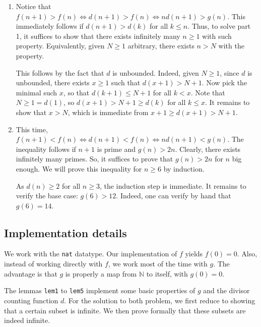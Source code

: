 \documentclass{article}
\newcommand{\N}{\mathbb{N}}
\begin{document}
\begin{enumerate}

\item
Notice that $f(n + 1) > f(n) \iff d(n + 1) > f(n) \iff n d(n + 1) > g(n)$.
This immediately follows if $d(n + 1) > d(k)$ for all $k \leq n$.
Thus, to solve part 1, it suffices to show that there exists infinitely many $n \geq 1$ with such property.
Equivalently, given $N \geq 1$ arbitrary, there exists $n > N$ with the property.

This follows by the fact that $d$ is unbounded.
Indeed, given $N \geq 1$, since $d$ is unbounded, there exists $x \geq 1$ such that $d(x + 1) > N + 1$.
Now pick the minimal such $x$, so that $d(k + 1) \leq N + 1$ for all $k < x$.
Note that $N \geq 1 = d(1)$, so $d(x + 1) > N + 1 \geq d(k)$ for all $k \leq x$.
It remains to show that $x > N$, which is immediate from $x + 1 \geq d(x + 1) > N + 1$.

\item
This time, $f(n + 1) < f(n) \iff d(n + 1) < f(n) \iff n d(n + 1) < g(n)$.
The inequality follows if $n + 1$ is prime and $g(n) > 2n$.
Clearly, there exists infinitely many primes.
So, it suffices to prove that $g(n) > 2n$ for $n$ big enough.
We will prove this inequality for $n \geq 6$ by induction.

As $d(n) \geq 2$ for all $n \geq 3$, the induction step is immediate.
It remains to verify the base case: $g(6) > 12$.
Indeed, one can verify by hand that $g(6) = 14$.

\end{enumerate}



\subsection*{Implementation details}

We work with the \texttt{nat} datatype.
Our implementation of $f$ yields $f(0) = 0$.
Also, instead of working directly with $f$, we work most of the time with $g$.
The advantage is that $g$ is properly a map from $\N$ to itself, with $g(0) = 0$.

The lemmas \texttt{lem1} to \texttt{lem5} implement some basic properties of $g$ and the divisor counting function $d$.
For the solution to both problem, we first reduce to showing that a certain subset is infinite.
We then prove formally that these subsets are indeed infinite.
\end{document}
